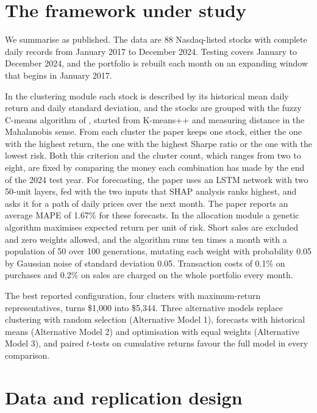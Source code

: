 \section{The framework under study}\label{sec3}

We summarise \citet{dastkhan2026} as published. The data are 88 Nasdaq-listed stocks with complete daily records from January 2017 to December 2024. Testing covers January to December 2024, and the portfolio is rebuilt each month on an expanding window that begins in January 2017.

In the clustering module each stock is described by its historical mean daily return and daily standard deviation, and the stocks are grouped with the fuzzy C-means algorithm of \citet{bezdek1984}, started from K-means++ and measuring distance in the Mahalanobis sense. From each cluster the paper keeps one stock, either the one with the highest return, the one with the highest Sharpe ratio or the one with the lowest risk. Both this criterion and the cluster count, which ranges from two to eight, are fixed by comparing the money each combination has made by the end of the 2024 test year. For forecasting, the paper uses an LSTM network \citep{hochreiter1997} with two 50-unit layers, fed with the two inputs that SHAP analysis ranks highest, and asks it for a path of daily prices over the next month. The paper reports an average MAPE of 1.67\% for these forecasts. In the allocation module a genetic algorithm maximises expected return per unit of risk. Short sales are excluded and zero weights allowed, and the algorithm runs ten times a month with a population of 50 over 100 generations, mutating each weight with probability 0.05 by Gaussian noise of standard deviation 0.05. Transaction costs of 0.1\% on purchases and 0.2\% on sales are charged on the whole portfolio every month.

The best reported configuration, four clusters with maximum-return representatives, turns \$1,000 into \$5,344. Three alternative models replace clustering with random selection (Alternative Model 1), forecasts with historical means (Alternative Model 2) and optimisation with equal weights (Alternative Model 3), and paired $t$-tests on cumulative returns favour the full model in every comparison.

\section{Data and replication design}\label{sec4}

